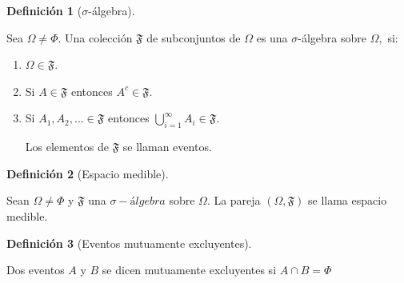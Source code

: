 \documentclass[
  us-letterpaper,
]{scrreprt}
\theoremstyle{plain}
\theoremstyle{plain}
\theoremstyle{definition}
\newtheorem{definition}{Definición}[chapter]
\theoremstyle{remark}
\begin{document}
\begin{definition}[\(\sigma\)-álgebra]\protect\hypertarget{def-sigma_algebra}{}\label{def-sigma_algebra}

Sea \(\Omega \neq \Phi\). Una colección \(\mathfrak{F}\) de subconjuntos
de \(\Omega\) es una \(\sigma\)-álgebra sobre \(\Omega,\) si:

\begin{enumerate}
\def\labelenumi{\roman{enumi}.}
\item
  \(\Omega \in  \mathfrak{F}\).
\item
  Si \(A \in \mathfrak{F}\) entonces \(A^c \in \mathfrak{F}\).
\item
  Si \(A_1, A_2, ... \in \mathfrak{F}\) entonces
  \(\bigcup_{i=1}^{\infty} A_i \in \mathfrak{F}\).

  Los elementos de \(\mathfrak{F}\) se llaman eventos.
\end{enumerate}

\end{definition}

\begin{definition}[Espacio
medible]\protect\hypertarget{def-espacio_medible}{}\label{def-espacio_medible}

Sean \(\Omega \neq \Phi\) y \(\mathfrak{F}\) una \(\sigma- álgebra\)
sobre \(\Omega\). La pareja \((\Omega, \mathfrak{F})\) se llama espacio
medible.

\end{definition}

\begin{definition}[Eventos mutuamente
excluyentes]\protect\hypertarget{def-mutuamente_excluyentes}{}\label{def-mutuamente_excluyentes}

Dos eventos \(A\) y \(B\) se dicen mutuamente excluyentes si
\(A \cap B = \Phi\)

\end{definition}
\end{document}
